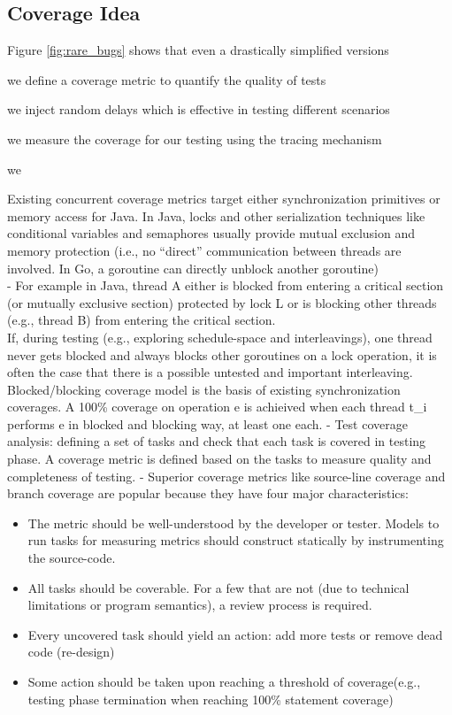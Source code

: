 \subsection{Coverage Idea}

Figure \ref{fig:rare_bugs} shows that even a drastically simplified versions

we define a coverage metric to quantify the quality of tests

we inject random delays which is effective in testing different scenarios

we measure the coverage for our testing using the tracing mechanism



we

Existing concurrent coverage metrics target either synchronization primitives or memory access for Java. In Java, locks and other serialization techniques like conditional variables and semaphores usually provide mutual exclusion and memory protection (i.e., no “direct” communication between threads are involved. In Go, a goroutine can directly unblock another goroutine)
\\
-	For example in Java,  thread A either is blocked from entering a critical section (or mutually exclusive section) protected by lock L or is blocking other threads (e.g., thread B) from entering the critical section.
\\
If, during testing (e.g., exploring schedule-space and interleavings), one thread never gets blocked and always blocks other goroutines on a lock operation, it is often the case that there is a possible untested and important interleaving. Blocked/blocking coverage model is the basis of existing synchronization coverages. A 100\% coverage on operation e is achieived when each thread t\_i performs e in blocked and blocking way, at least one each.
-	Test coverage analysis: defining a set of tasks and check that each task is covered in testing phase. A coverage metric is defined based on the tasks to measure quality and completeness of testing.
-	Superior coverage metrics like source-line coverage and branch coverage are popular because they have four major characteristics:
\begin{itemize}
  \item The metric should be well-understood by the developer or tester. Models to run tasks for measuring metrics should construct statically by instrumenting the source-code.
  \item All tasks should be coverable. For a few that are not (due to technical limitations or program semantics), a review process is required.
  \item Every uncovered task should yield an action: add more tests or remove dead code (re-design)
  \item Some action should be taken upon reaching a threshold of coverage(e.g., testing phase termination when reaching 100\% statement coverage)
\end{itemize}

